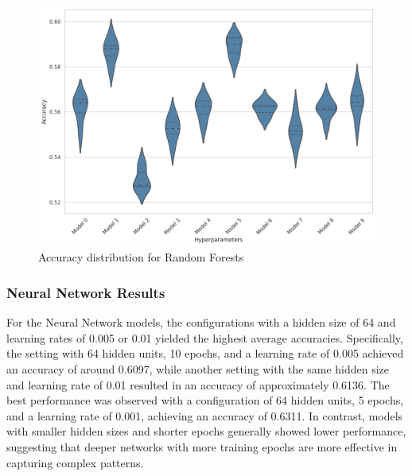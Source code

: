 \begin{figure}[H]
    \centering
    \includegraphics[width=0.99\columnwidth]{images/violin_plot_random_forest.png}
    \caption{Accuracy distribution for Random Forests}
    \label{fig:rf_violin_plot}
\end{figure}

\subsubsection{Neural Network Results}

For the Neural Network models, the configurations 
with a hidden size of 64 and learning rates of 0.005 
or 0.01 yielded the highest average accuracies. 
Specifically, the setting with 64 hidden units, 
10 epochs, and a learning rate of 0.005 achieved 
an accuracy of around 0.6097, while another setting 
with the same hidden size and learning rate of 0.01 
resulted in an accuracy of approximately 0.6136. 
The best performance was observed with a configuration 
of 64 hidden units, 5 epochs, and a learning rate of 0.001, 
achieving an accuracy of 0.6311. 
In contrast, models with smaller hidden sizes 
and shorter epochs generally showed lower performance, 
suggesting that deeper networks with more training epochs 
are more effective in capturing complex patterns.

